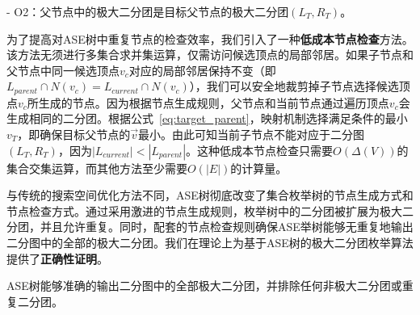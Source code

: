 - O2：父节点中的极大二分团是目标父节点的极大二分团$(L_T, R_T)$。


为了提高对ASE树中重复节点的检查效率，我们引入了一种\textbf{低成本节点检查}方法。该方法无须进行多集合求并集运算，仅需访问候选顶点的局部邻居。如果子节点和父节点中同一候选顶点$v_c$对应的局部邻居保持不变（即$L_{parent} \cap N(v_c) = L_{current} \cap N(v_c)$），我们可以安全地裁剪掉子节点选择候选顶点$v_c$所生成的节点。因为根据节点生成规则，父节点和当前节点通过遍历顶点$v_c$会生成相同的二分团。根据公式~\ref{eq:target_parent}，映射机制选择满足条件的最小$v_T$，即确保目标父节点的$\vec{v}$最小。由此可知当前子节点不能对应于二分图$(L_T, R_T)$，因为$|L_{current}|<|L_{parent}|$。这种低成本节点检查只需要$O(\Delta(V))$的集合交集运算，而其他方法至少需要$O(|E|)$的计算量。

与传统的搜索空间优化方法不同，ASE树彻底改变了集合枚举树的节点生成方式和节点检查方式。通过采用激进的节点生成规则，枚举树中的二分团被扩展为极大二分团，并且允许重复。同时，配套的节点检查规则确保ASE举树能够无重复地输出二分图中的全部的极大二分团。我们在理论上为基于ASE树的极大二分团枚举算法提供了\textbf{正确性证明}。


\begin{theorem}
  \label{theorem:correctness}
  ASE树能够准确的输出二分图中的全部极大二分团，并排除任何非极大二分团或重复二分团。
\end{theorem}

